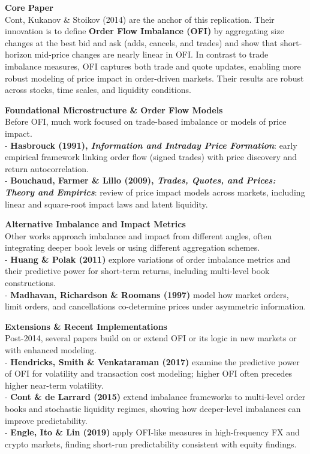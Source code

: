 \documentclass{article}
\begin{document}
\textbf{Core Paper}\\
Cont, Kukanov \& Stoikov (2014) are the anchor of this replication.
Their innovation is to define \textbf{Order Flow Imbalance (OFI)} by
aggregating size changes at the best bid and ask (adds, cancels, and
trades) and show that short-horizon mid-price changes are nearly linear
in OFI. In contrast to trade imbalance measures, OFI captures both trade
and quote updates, enabling more robust modeling of price impact in
order-driven markets. Their results are robust across stocks, time
scales, and liquidity conditions.

\textbf{Foundational Microstructure \& Order Flow Models}\\
Before OFI, much work focused on trade-based imbalance or models of
price impact.\\
- \textbf{Hasbrouck (1991), \emph{Information and Intraday Price
Formation}}: early empirical framework linking order flow (signed
trades) with price discovery and return autocorrelation.\\
- \textbf{Bouchaud, Farmer \& Lillo (2009), \emph{Trades, Quotes, and
Prices: Theory and Empirics}}: review of price impact models across
markets, including linear and square-root impact laws and latent
liquidity.

\textbf{Alternative Imbalance and Impact Metrics}\\
Other works approach imbalance and impact from different angles, often
integrating deeper book levels or using different aggregation schemes.\\
- \textbf{Huang \& Polak (2011)} explore variations of order imbalance
metrics and their predictive power for short-term returns, including
multi-level book constructions.\\
- \textbf{Madhavan, Richardson \& Roomans (1997)} model how market
orders, limit orders, and cancellations co-determine prices under
asymmetric information.

\textbf{Extensions \& Recent Implementations}\\
Post-2014, several papers build on or extend OFI or its logic in new
markets or with enhanced modeling.\\
- \textbf{Hendricks, Smith \& Venkataraman (2017)} examine the
predictive power of OFI for volatility and transaction cost modeling;
higher OFI often precedes higher near-term volatility.\\
- \textbf{Cont \& de Larrard (2015)} extend imbalance frameworks to
multi-level order books and stochastic liquidity regimes, showing how
deeper-level imbalances can improve predictability.\\
- \textbf{Engle, Ito \& Lin (2019)} apply OFI-like measures in
high-frequency FX and crypto markets, finding short-run predictability
consistent with equity findings.
\end{document}
